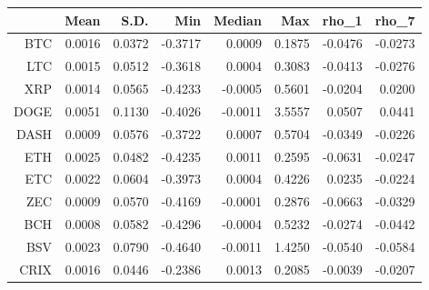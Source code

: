 \begin{tabular}{rrrrrrrr}
  \toprule
 & Mean & S.D. & Min & Median & Max & rho\_1 & rho\_7 \\ 
  \midrule
BTC & 0.0016 & 0.0372 & -0.3717 & 0.0009 & 0.1875 & -0.0476 & -0.0273 \\ 
  LTC & 0.0015 & 0.0512 & -0.3618 & 0.0004 & 0.3083 & -0.0413 & -0.0276 \\ 
  XRP & 0.0014 & 0.0565 & -0.4233 & -0.0005 & 0.5601 & -0.0204 & 0.0200 \\ 
  DOGE & 0.0051 & 0.1130 & -0.4026 & -0.0011 & 3.5557 & 0.0507 & 0.0441 \\ 
  DASH & 0.0009 & 0.0576 & -0.3722 & 0.0007 & 0.5704 & -0.0349 & -0.0226 \\ 
  ETH & 0.0025 & 0.0482 & -0.4235 & 0.0011 & 0.2595 & -0.0631 & -0.0247 \\ 
  ETC & 0.0022 & 0.0604 & -0.3973 & 0.0004 & 0.4226 & 0.0235 & -0.0224 \\ 
  ZEC & 0.0009 & 0.0570 & -0.4169 & -0.0001 & 0.2876 & -0.0663 & -0.0329 \\ 
  BCH & 0.0008 & 0.0582 & -0.4296 & -0.0004 & 0.5232 & -0.0274 & -0.0442 \\ 
  BSV & 0.0023 & 0.0790 & -0.4640 & -0.0011 & 1.4250 & -0.0540 & -0.0584 \\ 
  CRIX & 0.0016 & 0.0446 & -0.2386 & 0.0013 & 0.2085 & -0.0039 & -0.0207 \\ 
   \bottomrule
\end{tabular}
